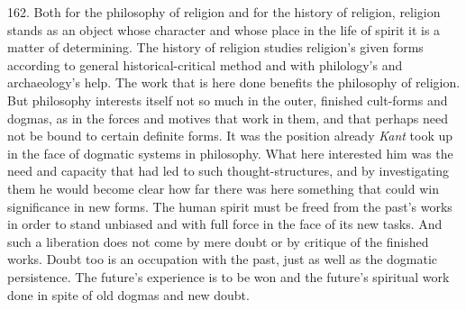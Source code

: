 \documentclass[12pt,a4paper]{book}
\begin{document}
162. Both for the philosophy of religion and for the history of religion, religion stands as an object
whose character and whose place in the life of spirit it is a matter of determining. The history of
religion studies religion's given forms according to general historical-critical method and with
philology's and archaeology's help. The work that is here done benefits the philosophy of religion. But
philosophy interests itself not so much in the outer, finished cult-forms and dogmas, as in the forces and
motives that work in them, and that perhaps need not be bound to certain definite forms. It was the
position already \emph{Kant} took up in the face of dogmatic systems in philosophy. What here interested
him was the need and capacity that had led to such thought-structures, and by investigating them he would
become clear how far there was here something that could win significance in new forms. The human spirit
must be freed from the past's works in order to stand unbiased and with full force in the face of its new
tasks. And such a liberation does not come by mere doubt or by critique of the finished works. Doubt too is
an occupation with the past, just as well as the dogmatic persistence. The future's experience is to be won
and the future's spiritual work done in spite of old dogmas and new doubt.
\end{document}
